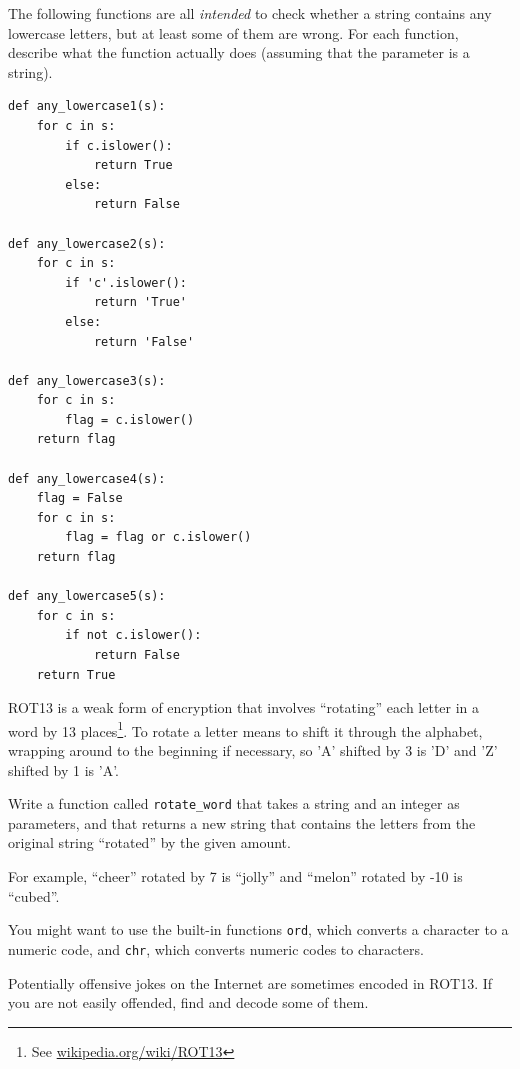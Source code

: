 \documentclass[10pt]{book}
\begin{document}
\begin{ex}
The following functions are all {\em intended} to check whether a
string contains any lowercase letters, but at least some of them are
wrong.  For each function, describe what the function actually does
(assuming that the parameter is a string).

\beforeverb
\begin{verbatim}
def any_lowercase1(s):
    for c in s:
        if c.islower():
            return True
        else:
            return False

def any_lowercase2(s):
    for c in s:
        if 'c'.islower():
            return 'True'
        else:
            return 'False'

def any_lowercase3(s):
    for c in s:
        flag = c.islower()
    return flag

def any_lowercase4(s):
    flag = False
    for c in s:
        flag = flag or c.islower()
    return flag

def any_lowercase5(s):
    for c in s:
        if not c.islower():
            return False
    return True
\end{verbatim}
\afterverb

\end{ex}


\begin{ex}

\label{exrotate}
ROT13 is a weak form of encryption that involves ``rotating'' each
letter in a word by 13 places\footnote{See
  \url{wikipedia.org/wiki/ROT13}}.  To rotate a letter means
to shift it through the alphabet, wrapping around to the beginning if
necessary, so 'A' shifted by 3 is 'D' and 'Z' shifted by 1 is 'A'.

Write a function called \verb"rotate_word"
that takes a string and an integer as parameters, and that returns
a new string that contains the letters from the original string
``rotated'' by the given amount.  

For example, ``cheer'' rotated by 7 is ``jolly'' and ``melon'' rotated
by -10 is ``cubed''.  


You might want to use the built-in functions {\tt ord}, which converts
a character to a numeric code, and {\tt chr}, which converts numeric
codes to characters.

Potentially offensive jokes on the Internet are sometimes encoded
in ROT13.  If you are not easily offended, find and decode some
of them.
\end{ex}
\end{document}
